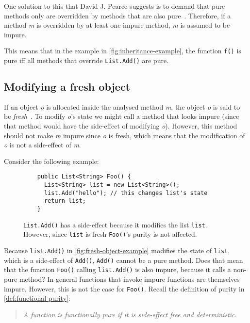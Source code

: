 \documentclass[a4paper,12pt]{article}
\begin{document}
One solution to this that David J. Pearce suggests is to demand that pure methods only are overridden by methods that are also pure~\cite{pearce2011jpure}. Therefore, if a method \textit{m} is overridden by at least one impure method, \textit{m} is assumed to be impure.

This means that in the example in \autoref{fig:inheritance-example}, the function \texttt{f()} is pure iff all methods that override \texttt{List.Add()} are pure.

\subsection{Modifying a fresh object} \label{sub:modifying-fresh-objects}

If an object \textit{o} is allocated inside the analysed method \textit{m}, the object \textit{o} is said to be \textit{fresh}~\cite{pearce2011jpure}. To modify \textit{o}'s state we might call a method that looks impure (since that method would have the side-effect of modifying \textit{o}). However, this method should not make \textit{m} impure since \textit{o} is fresh, which means that the modification of \textit{o} is not a side-effect of \textit{m}.

Consider the following example:

\begin{figure}[H]
  \centering
  \begin{lstlisting}
    public List<String> Foo() {
      List<String> list = new List<String>();
      list.Add("hello"); // this changes list's state
      return list;
    }
  \end{lstlisting}
  \caption{\texttt{List.Add()} has a side-effect because it modifies the list \texttt{list}. However, since \texttt{list} is fresh \texttt{Foo()}'s purity is not affected.}
  \label{fig:fresh-object-example}
\end{figure}

Because \texttt{list.Add()} in \autoref{fig:fresh-object-example} modifies the state of \texttt{list}, which is a side-effect of \texttt{Add()}, \texttt{Add()} cannot be a pure method. Does that mean that the function \texttt{Foo()} calling \texttt{list.Add()} is also impure, because it calls a non-pure method? In general functions that invoke impure functions are themselves impure. However, this is not the case for \texttt{Foo()}. Recall the definition of purity in \autoref{def:functional-purity}:

\begin{quote}
  \textit{A function is functionally pure if it is side-effect free and deterministic}.
\end{quote}
\end{document}

